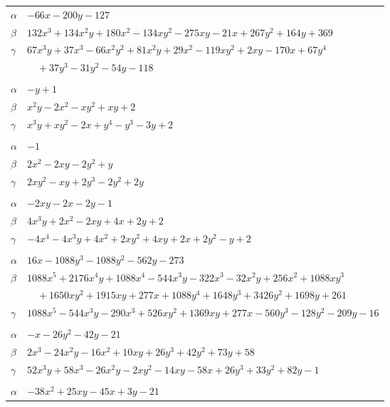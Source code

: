 \documentclass[11pt]{article}
\begin{document}
\begin{longtable}{@{}ll@{}}
$\alpha$ & $-66x-200y-127$\\
$\beta$ & $132x^{3}+134x^{2}y+180x^{2}-134xy^{2}-275xy-21x+267y^{2}+164y+369$\\
$\gamma$ & $67x^{3}y+37x^{3}-66x^{2}y^{2}+81x^{2}y+29x^{2}-119xy^{2}+2xy-170x+67y^{4}$\\
 & $\quad +37y^{3}-31y^{2}-54y-118$\\
\addlinespace[3pt]
\multicolumn{2}{@{}l}{$\{i,j\}=\{13,55\}$, $k_{ij}=1$}\\
$\alpha$ & $-y+1$\\
$\beta$ & $x^{2}y-2x^{2}-xy^{2}+xy+2$\\
$\gamma$ & $x^{3}y+xy^{2}-2x+y^{4}-y^{3}-3y+2$\\
\addlinespace[3pt]
\multicolumn{2}{@{}l}{$\{i,j\}=\{13,66\}$, $k_{ij}=1$}\\
$\alpha$ & $-1$\\
$\beta$ & $2x^{2}-2xy-2y^{2}+y$\\
$\gamma$ & $2xy^{2}-xy+2y^{3}-2y^{2}+2y$\\
\addlinespace[3pt]
\multicolumn{2}{@{}l}{$\{i,j\}=\{13,70\}$, $k_{ij}=1$}\\
$\alpha$ & $-2xy-2x-2y-1$\\
$\beta$ & $4x^{3}y+2x^{2}-2xy+4x+2y+2$\\
$\gamma$ & $-4x^{4}-4x^{3}y+4x^{2}+2xy^{2}+4xy+2x+2y^{2}-y+2$\\
\addlinespace[3pt]
\multicolumn{2}{@{}l}{$\{i,j\}=\{14,20\}$, $k_{ij}=3\cdot 7\cdot 13$}\\
$\alpha$ & $16x-1088y^{3}-1088y^{2}-562y-273$\\
$\beta$ & $1088x^{5}+2176x^{4}y+1088x^{4}-544x^{3}y-322x^{3}-32x^{2}y+256x^{2}+1088xy^{3}$\\
 & $\quad +1650xy^{2}+1915xy+277x+1088y^{4}+1648y^{3}+3426y^{2}+1698y+261$\\
$\gamma$ & $1088x^{5}-544x^{3}y-290x^{3}+526xy^{2}+1369xy+277x-560y^{3}-128y^{2}-209y-16$\\
\addlinespace[3pt]
\multicolumn{2}{@{}l}{$\{i,j\}=\{14,51\}$, $k_{ij}=3\cdot 7$}\\
$\alpha$ & $-x-26y^{2}-42y-21$\\
$\beta$ & $2x^{3}-24x^{2}y-16x^{2}+10xy+26y^{3}+42y^{2}+73y+58$\\
$\gamma$ & $52x^{3}y+58x^{3}-26x^{2}y-2xy^{2}-14xy-58x+26y^{3}+33y^{2}+82y-1$\\
\addlinespace[3pt]
\multicolumn{2}{@{}l}{$\{i,j\}=\{14,52\}$, $k_{ij}=3\cdot 7$}\\
$\alpha$ & $-38x^{2}+25xy-45x+3y-21$\\

\end{longtable}
\end{document}
